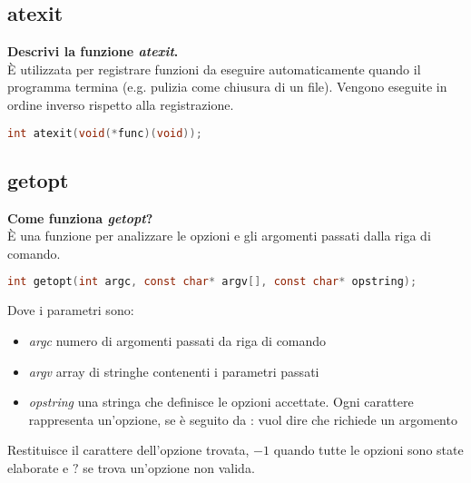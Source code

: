 \subsection{atexit}
\textbf{Descrivi la funzione \textit{atexit}.}\\
È utilizzata per registrare funzioni da eseguire automaticamente quando il programma termina (e.g. pulizia come chiusura di un file). Vengono eseguite in ordine inverso rispetto alla registrazione.
\begin{lstlisting}[language=C]
	int atexit(void(*func)(void));
\end{lstlisting}
\newpage
\subsection{getopt}
\textbf{Come funziona \textit{getopt}?}\\
È una funzione per analizzare le opzioni e gli argomenti passati dalla riga di comando.
\begin{lstlisting}[language=C]
	int getopt(int argc, const char* argv[], const char* opstring);
\end{lstlisting}
Dove i parametri sono:
\begin{itemize}
	\item \textit{argc} numero di argomenti passati da riga di comando
	\item \textit{argv} array di stringhe contenenti i parametri passati
	\item \textit{opstring} una stringa che definisce le opzioni accettate. Ogni carattere rappresenta un'opzione, se è seguito da : vuol dire che richiede un argomento
\end{itemize}
Restituisce il carattere dell'opzione trovata, $-1$ quando tutte le opzioni sono state elaborate e $?$ se trova un'opzione non valida.
